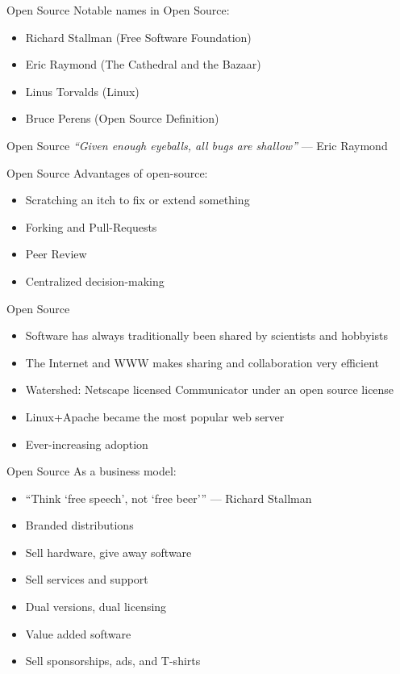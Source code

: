 \begin{frame}{Open Source}
Notable names in Open Source:

	\begin{itemize}
		\item Richard Stallman (Free Software Foundation)
		\item Eric Raymond (The Cathedral and the Bazaar)
		\item Linus Torvalds (Linux)
		\item Bruce Perens (Open Source Definition)
	\end{itemize}
\end{frame}

\begin{frame}{Open Source}
\textit{``Given enough eyeballs, all bugs are shallow''}
--- Eric Raymond
\end{frame}

\begin{frame}{Open Source}
Advantages of open-source:

	\begin{itemize}
		\item Scratching an itch to fix or extend something
		\item Forking and Pull-Requests
		\item Peer Review
		\item Centralized decision-making
	\end{itemize}
\end{frame}

\begin{frame}{Open Source}
	\begin{itemize}
		\item Software has always traditionally been shared by scientists and hobbyists
		\item The Internet and WWW makes sharing and collaboration very efficient
		\item Watershed: Netscape licensed Communicator under an open source license
		\item Linux+Apache became the most popular web server
		\item Ever-increasing adoption
	\end{itemize}
\end{frame}

\begin{frame}{Open Source}
As a business model:

	\begin{itemize}
		\item ``Think `free speech', not `free beer''' --- Richard Stallman
		\item Branded distributions
		\item Sell hardware, give away software
		\item Sell services and support
		\item Dual versions, dual licensing
		\item Value added software
		\item Sell sponsorships, ads, and T-shirts
	\end{itemize}
\end{frame}

